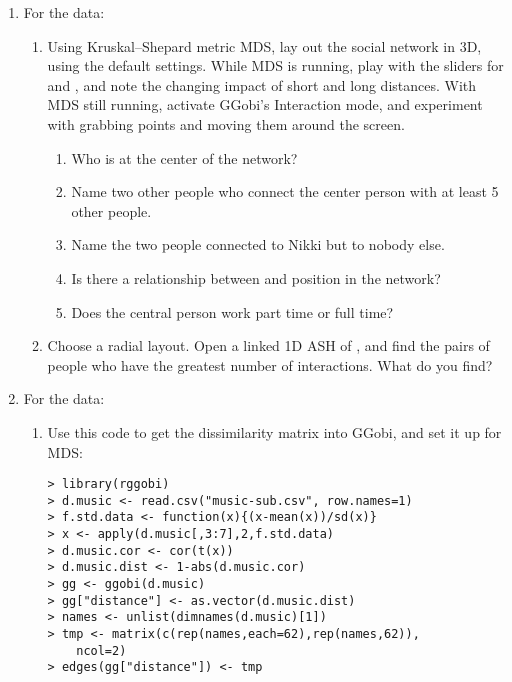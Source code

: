 \begin{enumerate}
\item For the  data:
\begin{enumerate}
\item Using Kruskal--Shepard metric MDS, lay out the social network in
3D, using the default settings.  While MDS is running, play with the
sliders for  and , and note the
changing impact of short and long distances.  With MDS still running,
activate GGobi's  Interaction mode, and experiment
with grabbing points and moving them around the screen.
\begin{enumerate}
\item Who is at the center of the network? %
\item Name two other people who connect the center person with at least 
5 other people. %
\item Name the two people connected to Nikki but to nobody else. %
\item Is there a relationship between  and 
position in the network?
\item Does the central person work part time or full time? %
\end{enumerate}
\item Choose a radial layout.  Open a linked 1D ASH of
, and find the pairs of people who have the
greatest number of interactions.  What do you find?  

\end{enumerate}
\item For the  data:
\begin{enumerate}
\item Use this code to get the dissimilarity matrix into GGobi, and set
it up for MDS:

\begin{verbatim}
> library(rggobi)
> d.music <- read.csv("music-sub.csv", row.names=1)
> f.std.data <- function(x){(x-mean(x))/sd(x)}
> x <- apply(d.music[,3:7],2,f.std.data)
> d.music.cor <- cor(t(x))
> d.music.dist <- 1-abs(d.music.cor)
> gg <- ggobi(d.music)
> gg["distance"] <- as.vector(d.music.dist)
> names <- unlist(dimnames(d.music)[1])
> tmp <- matrix(c(rep(names,each=62),rep(names,62)), 
    ncol=2)
> edges(gg["distance"]) <- tmp
\end{verbatim}


\end{enumerate}
\end{enumerate}
